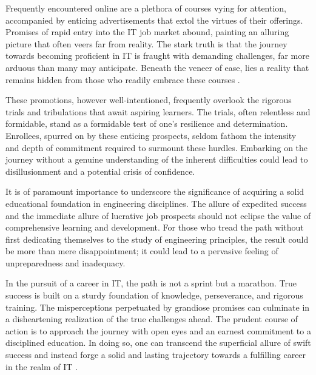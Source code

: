 \documentclass[
    a4paper, %
    10pt, %
    unnumberedsections, %
    twoside, %
]{LTJournalArticle}
\begin{document}

Frequently encountered online are a plethora of courses vying for attention, accompanied by enticing advertisements that extol the virtues of their offerings. Promises of rapid entry into the IT job market abound, painting an alluring picture that often veers far from reality. The stark truth is that the journey towards becoming proficient in IT is fraught with demanding challenges, far more arduous than many may anticipate. Beneath the veneer of ease, lies a reality that remains hidden from those who readily embrace these courses \cite{dweck2006mindset,duckworth2016grit}.

These promotions, however well-intentioned, frequently overlook the rigorous trials and tribulations that await aspiring learners. The trials, often relentless and formidable, stand as a formidable test of one’s resilience and determination. Enrollees, spurred on by these enticing prospects, seldom fathom the intensity and depth of commitment required to surmount these hurdles. Embarking on the journey without a genuine understanding of the inherent difficulties could lead to disillusionment and a potential crisis of confidence.

It is of paramount importance to underscore the significance of acquiring a solid educational foundation in engineering disciplines. The allure of expedited success and the immediate allure of lucrative job prospects should not eclipse the value of comprehensive learning and development. For those who tread the path without first dedicating themselves to the study of engineering principles, the result could be more than mere disappointment; it could lead to a pervasive feeling of unpreparedness and inadequacy.

In the pursuit of a career in IT, the path is not a sprint but a marathon. True success is built on a sturdy foundation of knowledge, perseverance, and rigorous training. The misperceptions perpetuated by grandiose promises can culminate in a disheartening realization of the true challenges ahead. The prudent course of action is to approach the journey with open eyes and an earnest commitment to a disciplined education. In doing so, one can transcend the superficial allure of swift success and instead forge a solid and lasting trajectory towards a fulfilling career in the realm of IT \cite{tetlock2007illusion}.
\end{document}
